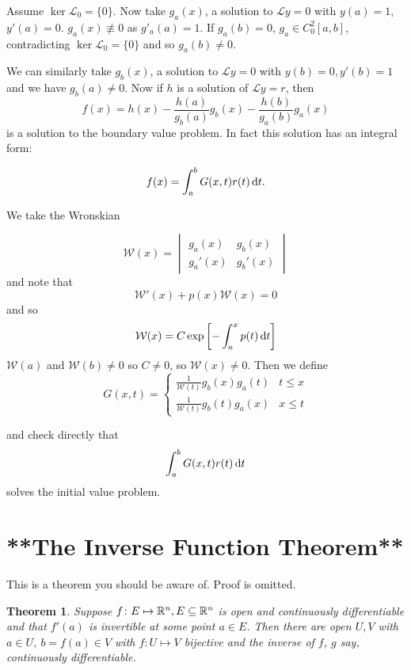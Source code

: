 \documentclass{notes}
\theoremstyle{plain}
\newtheorem{theorem}[proposition]{Theorem}
\newcommand{\cL}{\mathcal{L}}
\begin{document}
Assume $ \ker \cL_{0} = \{ 0 \} $.
Now take $ g_{a}(x) $, a solution to $ \cL y=0 $ with $ y(a)=1 $, $ 
y'(a) =0 $.  $ g_{a}(x) \not \equiv 0 $ as $ g'_{a}(a)=1 $.
If $ g_{a}(b) =0 $, $ g_{a}\in C_{0}^{2}[a,b] $, contradicting $ 
\ker \cL_{0} = \{ 0 \} $ and so $ g_{a}(b) \neq 0 $.

We can similarly take $ g_{b}(x) $, a solution to $ \cL y =0 $
with $ y(b)=0, y'(b)=1 $ and we have $ g_{b}(a) \neq 0 $.
Now if $ h $ is a solution of $ \cL y = r $, then
\[
f(x) = h(x) - \frac{h(a)}{g_{b}(a)} g_{b}(x) - 
\frac{h(b)}{g_{a}(b)} g_{a}(x) \]
is a solution to the boundary value problem.
In fact this solution has an integral form:

\[
f(x) = \int_{a}^{b}G(x,t)r(t)\,\mathrm{d} t.
\]

We take the Wronskian

\[ \mathcal{W}(x) = \begin{vmatrix} g_{a}(x) & g_{b}(x) \\ 
g_{a}'(x) & g_{b}'(x) \end{vmatrix} \] and note that
\[ \mathcal{W}'(x) + p(x) \mathcal{W}(x) =0\] and so
\[ \mathcal{W}(x) = C \exp \left[ - \int_{a}^{x} p(t) \,\mathrm{d} t \right] \] 
$ \mathcal{W}(a)  $ and $ \mathcal{W}(b) \neq 0  $ so $ C \neq 0 
$, so $ \mathcal{W}(x) \neq 0 $.
Then we define
\[ G(x,t) =
\begin{cases}
\frac{1}{\mathcal{W}(t)} g_{b}(x) g_{a}(t) & t \leq x \\
\frac{1}{\mathcal{W}(t)} g_{b}(t) g_{a}(x) & x \leq t
\end{cases} \]

and check directly that
\[
\int_{a}^{b}G(x,t)r(t)\,\mathrm{d} t
\] solves the initial value problem.

\section[The Inverse Function Theorem]%
{**The Inverse Function Theorem**}

This is a theorem you should be aware of.  Proof is omitted.

\begin{theorem}
Suppose $ f\colon E \mapsto \mathbb{R}^{n}, E \subseteq \mathbb{R}^{n} $ is open and 
continuously differentiable and that $ f'(a) $ is invertible at 
some point $ a \in E $. Then there are open $ U,V $ with $ a \in U 
$, $ b =f(a) \in V $ with $ f\colon U \mapsto V $ bijective and 
the inverse of $ f $, $ g $ say, continuously differentiable.
\end{theorem}
\end{document}
